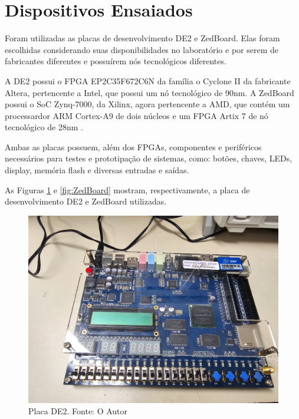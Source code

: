 \section{Dispositivos Ensaiados}
\label{sec:MetDispositivos}

Foram utilizadas as placas de desenvolvimento DE2 e ZedBoard. Elas foram escolhidas considerando suas disponibilidades no laboratório e por serem de fabricantes diferentes e possuírem nós tecnológicos diferentes.

A DE2 possui o FPGA EP2C35F672C6N da família o Cyclone II da fabricante Altera, pertencente a Intel, que possui um nó tecnológico de 90nm. A ZedBoard possui o SoC Zynq-7000, da Xilinx, agora pertencente a AMD, que contém um processardor ARM Cortex-A9 de dois núcleos e um FPGA Artix 7 de nó tecnológico de 28nm \cite{AmdFpga2}.

Ambas as placas possuem, além dos FPGAs, componentes e periféricos necessários para testes e prototipação de sistemas, como: botões, chaves, LEDs, display, memória flash e diversas entradas e saídas.

As Figuras \ref{fig:DE2Board} e \ref{fig:ZedBoard} mostram, respectivamente, a placa de desenvolvimento DE2 e ZedBoard utilizadas.

\begin{figure}[H]
    \centering
    \includegraphics[scale=0.2]{figures/Metodologia/DE2.jpeg}
    \caption{Placa DE2. Fonte: O Autor}
    \label{fig:DE2Board}
\end{figure}

